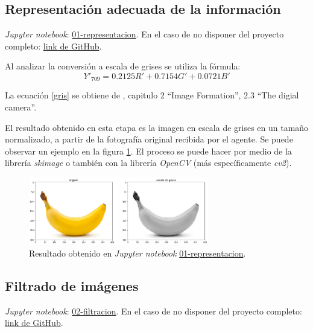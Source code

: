 \documentclass[10pt,a4paper]{article}
\begin{document}
\subsection{Representación adecuada de la información}
\textit{Jupyter notebook}: \href{./01-representacion.ipynb}{01-representacion}. En el caso de no disponer del proyecto completo: \href{https://github.com/FernandezGFG/fruit-classifier/blob/master/01-representacion.ipynb}{link de GitHub}.

Al analizar la conversión a escala de grises se utiliza la fórmula:
\begin{equation}
Y'_{709}=0.2125R'+0.7154G'+0.0721B'
\label{gris}
\end{equation}

La ecuación \ref{gris} se obtiene de \textcite{szeliski}, capitulo 2 ``Image Formation'', 2.3 ``The digial camera''.

El resultado obtenido en esta etapa es la imagen en escala de grises en un tamaño normalizado, a partir de la fotografía original recibida por el agente. Se puede observar un ejemplo en la figura \ref{resultado-01}. El proceso se puede hacer por medio de la librería \textit{skimage} o también con la librería \textit{OpenCV} (más específicamente \textit{cv2}).

\begin{figure}[h]
\centering
\includegraphics[width=0.7\textwidth]{imgs/resultado-01.png}
\caption{Resultado obtenido en \textit{Jupyter notebook} \href{./01-representacion}{01-representacion}.}
\label{resultado-01}
\end{figure}

\subsection{Filtrado de imágenes}
\textit{Jupyter notebook}: \href{./02-filtracion.ipynb}{02-filtracion}. En el caso de no disponer del proyecto completo: \href{https://github.com/FernandezGFG/fruit-classifier/blob/master/02-filtracion.ipynb}{link de GitHub}.
\end{document}
